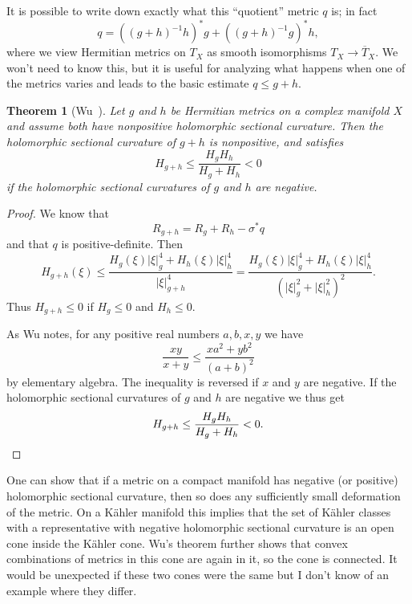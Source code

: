 \documentclass[10pt,a4paper]{amsart}
\newtheorem{theo}{Theorem}
\def\ov#1{\overline{#1}}
\begin{document}
It is possible to write down exactly what this ``quotient'' metric $q$ is; in fact
\[
q = ((g+h)^{-1}h)^*g
+ ((g+h)^{-1}g)^*h,
\]
where we view Hermitian metrics on $T_X$ as smooth isomorphisms $T_X \to
\ov{T}_X$. We won't need to know this, but it is useful for analyzing what
happens when one of the metrics varies and leads to the basic estimate $q \leq g
+ h$.



\begin{theo}[Wu~\cite{wu1973remark}]
Let $g$ and $h$ be Hermitian metrics on a complex manifold $X$ and assume both
have nonpositive holomorphic sectional curvature.
Then the holomorphic sectional curvature of $g + h$ is nonpositive, and satisfies
\[
H_{g + h} \leq \frac{H_g H_h}{H_g + H_h} < 0
\]
if the holomorphic sectional curvatures of $g$ and $h$ are negative.
\end{theo}

\begin{proof}
We know that
\[
R_{g + h} = R_g + R_h - \sigma^* q
\]
and that $q$ is positive-definite.
Then
\[
H_{g+h}(\xi)
\leq \frac{H_g(\xi) |\xi|^4_g + H_h(\xi) |\xi|^4_h}{|\xi|^4_{g + h}}
= \frac{H_g(\xi) |\xi|^4_g + H_h(\xi) |\xi|^4_h}{(|\xi|^2_{g} + |\xi|^2_h)^2}.
\]
Thus $H_{g + h} \leq 0$ if $H_g \leq 0$ and $H_h \leq 0$.

As Wu notes,
for any positive real numbers $a, b, x, y$ we have
\[
\frac{xy}{x + y} \leq \frac{x a^2 + y b^2}{(a + b)^2}
\]
by elementary algebra.
The inequality is reversed if $x$ and $y$ are negative.
If the holomorphic sectional curvatures of $g$ and $h$ are negative we thus get
\[
H_{g + h} \leq \frac{H_g H_h}{H_g + H_h} < 0.
\qedhere
\]
\end{proof}


One can show that if a metric on a compact manifold has negative (or positive)
holomorphic sectional curvature, then so does any sufficiently small
deformation of the metric.
On a K\"ahler manifold this implies that the set of K\"ahler classes with a
representative with negative holomorphic sectional curvature is an open cone
inside the K\"ahler cone.
Wu's theorem further shows that convex combinations of metrics in this cone are
again in it, so the cone is connected.
It would be unexpected if these two cones were the same but I don't know of an
example where they differ.





\end{document}

